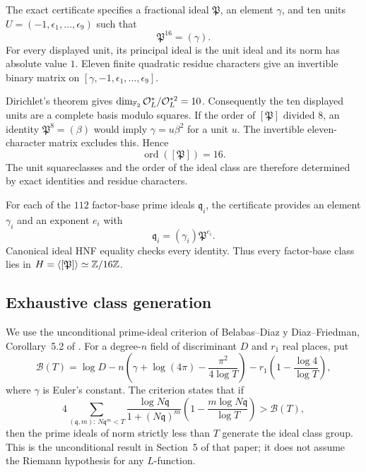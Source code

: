 \documentclass[11pt,a4paper]{article}
\theoremstyle{definition}\newtheorem{definition}[theorem]{Definition}
\theoremstyle{remark}\newtheorem{remark}[theorem]{Remark}
\newcommand{\OO}{\mathcal O}\newcommand{\Cl}{\operatorname{Cl}}
\begin{document}
The exact certificate specifies a fractional ideal $\mathfrak P$, an element
$\gamma$, and ten units $U=(-1,\epsilon_1,\ldots,\epsilon_9)$ such that
\[
\mathfrak P^{16}=(\gamma).
\]
For every displayed unit, its principal ideal is the unit ideal and its norm
has absolute value $1$. Eleven finite quadratic residue characters give
an invertible binary matrix on
$[\gamma,-1,\epsilon_1,\ldots,\epsilon_9]$.

Dirichlet's theorem gives $\dim_{\F_2}\OO_L^*/\OO_L^{*2}=10$.
Consequently the ten displayed units are a complete basis modulo squares.
If the order of $[\mathfrak P]$ divided $8$, an identity
$\mathfrak P^8=(\beta)$ would imply $\gamma=u\beta^2$ for a unit $u$.
The invertible eleven-character matrix excludes this. Hence
\begin{equation}\label{eq:Porder}
\operatorname{ord}([\mathfrak P])=16.
\end{equation}
The unit squareclasses and the order of the ideal class are therefore determined by exact identities and residue characters.

For each of the $112$ factor-base prime ideals $\mathfrak q_i$,
the certificate provides an element $\gamma_i$ and an exponent $e_i$ with
\[
\mathfrak q_i=(\gamma_i)\mathfrak P^{e_i}.
\]
Canonical ideal HNF equality checks every identity. Thus every factor-base class lies in
$H=\langle[\mathfrak P]\rangle\simeq\mathbb Z/16\mathbb Z$.

\subsection{Exhaustive class generation}

We use the unconditional prime-ideal criterion of
Belabas--Diaz y Diaz--Friedman, Corollary~5.2 of \cite{BDDF}.
For a degree-$n$ field of discriminant $D$ and $r_1$ real places, put
\[
\mathcal B(T)=\log D-n\left(\gamma+\log(4\pi)
 -\frac{\pi^2}{4\log T}\right)
 -r_1\left(1-\frac{\log4}{\log T}\right),
\]
where $\gamma$ is Euler's constant. The criterion states that if
\begin{equation}\label{eq:analytic-generation}
4\sum_{(\mathfrak q,m):\,N\mathfrak q^m<T}
 \frac{\log N\mathfrak q}{1+(N\mathfrak q)^m}
 \left(1-\frac{m\log N\mathfrak q}{\log T}\right)
 >\mathcal B(T),
\end{equation}
then the prime ideals of norm strictly less than $T$ generate the ideal
class group. This is the unconditional result in Section~5 of that paper;
it does not assume the Riemann hypothesis for any $L$-function.
\end{document}

